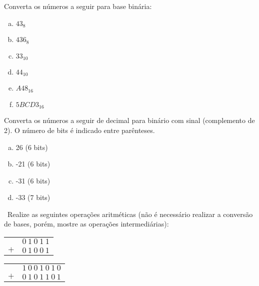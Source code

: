  Converta os números a seguir para base binária:

\begin{enumerate}[a)]
\item $43_8$
\item $436_8$
\item $33_{10}$
\item $44_{10}$
\item $A48_{16}$
\item $5BCD3_{16}$
\end{enumerate}

 Converta os números a seguir de decimal para
binário com sinal (complemento de 2). O número de bits é
indicado entre parênteses.

\begin{enumerate}[a)]
\item 26 (6 bits)
\item -21 (6 bits)
\item -31 (6 bits)
\item -33 (7 bits)
\end{enumerate}

~Realize as seguintes operações aritméticas (não é
necessário realizar a conversão de bases, porém, mostre as operações
intermediárias):\bigskip

\begin{minipage}{.5\textwidth}
\begin{center}
  \begin{tabular}[h]{rc}
     & $0\ 1\ 0\ 1\ 1$ \\
    $+$& $0\ 1\ 0\ 0\ 1$ \\\hline
  \end{tabular}
\end{center}
\end{minipage}
\begin{minipage}{.5\textwidth}
\begin{center}
  \begin{tabular}[h]{rc}
     & $1\ 0\ 0\ 1\ 0\ 1\ 0$ \\
    $+$& $0\ 1\ 0\ 1\ 1\ 0\ 1$ \\\hline
  \end{tabular}
\end{center}
\end{minipage}\vspace{1.5cm}

